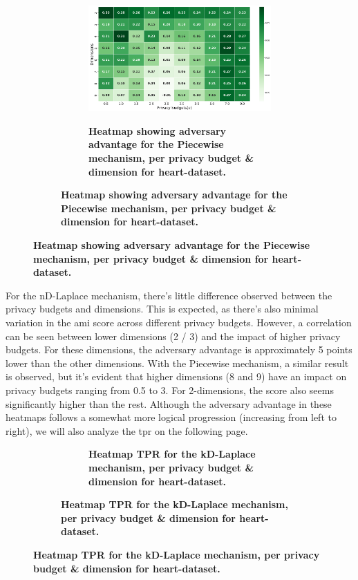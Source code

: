 {\begin{figure}[H]
\begin{subfigure}[b]{0.75\textwidth}
    \begin{subfigure}[c]{1\textwidth}
      \caption{\textbf{Heatmap showing adversary advantage for the Piecewise mechanism, per privacy budget \& dimension for heart-dataset.}}
      \includegraphics[width=1\textwidth]{Results/nd-laplace/piecewise/heart-dataset/shokri_mi_adv.png}
      \label{fig:privacy_heart-dataset_adversial_advantage_piecewise}
    \end{subfigure}
  \end{subfigure}
\end{figure}
For the nD-Laplace mechanism, there's little difference observed between the privacy budgets and dimensions. This is expected, as there's also minimal variation in the \gls{ami} score across different privacy budgets. However, a correlation can be seen between lower dimensions (2 / 3) and the impact of higher privacy budgets. For these dimensions, the adversary advantage is approximately 5 points lower than the other dimensions.
With the Piecewise mechanism, a similar result is observed, but it's evident that higher dimensions (8 and 9) have an impact on privacy budgets ranging from 0.5 to 3. For 2-dimensions, the score also seems significantly higher than the rest.
Although the adversary advantage in these heatmaps follows a somewhat more logical progression (increasing from left to right), we will also analyze the \gls{tpr} on the following page. 
\newpage
\begin{figure}[H]
    \centering
    \begin{subfigure}[b]{0.75\textwidth}
        \begin{subfigure}[c]{1\textwidth}
            \caption{\textbf{Heatmap TPR for the kD-Laplace mechanism, per privacy budget \& dimension for heart-dataset.}}

\end{subfigure}
\end{subfigure}
\end{figure}}
